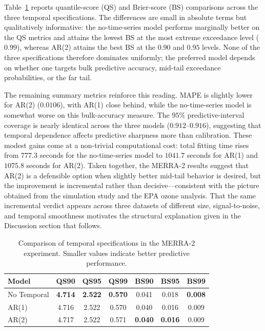 Table~\ref{tab:merra2-temporal-compare} reports quantile-score (QS) and Brier-score (BS) comparisons across the three temporal specifications.  The differences are small in absolute terms but qualitatively informative: the no-time-series model performs marginally better on the QS metrics and attains the lowest BS at the most extreme exceedance level ($0.99$), whereas AR(2) attains the best BS at the $0.90$ and $0.95$ levels.  None of the three specifications therefore dominates uniformly; the preferred model depends on whether one targets bulk predictive accuracy, mid-tail exceedance probabilities, or the far tail.

The remaining summary metrics reinforce this reading.  MAPE is slightly lower for AR(2) ($0.0106$), with AR(1) close behind, while the no-time-series model is somewhat worse on this bulk-accuracy measure.  The $95\%$ predictive-interval coverage is nearly identical across the three models ($0.912$--$0.916$), suggesting that temporal dependence affects predictive sharpness more than calibration.  These modest gains come at a non-trivial computational cost: total fitting time rises from $777.3$ seconds for the no-time-series model to $1041.7$ seconds for AR(1) and $1075.8$ seconds for AR(2).  Taken together, the MERRA-2 results suggest that AR(2) is a defensible option when slightly better mid-tail behavior is desired, but the improvement is incremental rather than decisive---consistent with the picture obtained from the simulation study and the EPA ozone analysis.  That the same incremental verdict appears across three datasets of different size, signal-to-noise, and temporal smoothness motivates the structural explanation given in the Discussion section that follows.

\begin{table}[htbp]
\centering
\caption{Comparison of temporal specifications in the MERRA-2 experiment. Smaller values indicate better predictive performance.}
\label{tab:merra2-temporal-compare}
\scriptsize
\begin{tabular}{@{}lcccccc@{}}
\toprule
Model & QS90 & QS95 & QS99 & BS90 & BS95 & BS99 \\
\midrule
No Temporal & \textbf{4.714} & \textbf{2.522} & \textbf{0.570} & 0.041 & 0.018 & \textbf{0.008} \\
AR(1) & 4.716 & 2.522 & 0.570 & 0.040 & 0.016 & 0.009 \\
AR(2) & 4.717 & 2.522 & 0.571 & \textbf{0.040} & \textbf{0.016} & 0.009 \\
\bottomrule
\end{tabular}
\end{table}
